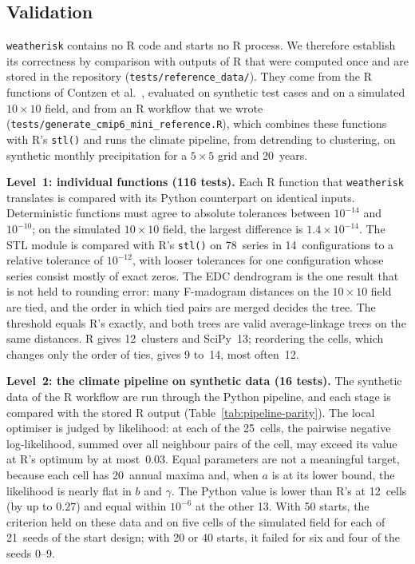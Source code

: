 \documentclass[preprint,12pt,a4paper]{elsarticle}
\begin{document}
\subsection{Validation}
\label{sec:validation}

\texttt{weatherisk} contains no R code and starts no R process. We
therefore establish its correctness by comparison with outputs of R
that were computed once and are stored in the repository
(\texttt{tests/reference\_data/}). They come from the R functions of
Contzen et al.~\cite{contzen2025}, evaluated on synthetic test cases
and on a simulated $10{\times}10$ field, and from an R workflow that
we wrote (\texttt{tests/generate\_cmip6\_mini\_reference.R}), which
combines these functions with R's \texttt{stl()} and runs the
climate pipeline, from detrending to clustering, on synthetic monthly
precipitation for a $5{\times}5$ grid and 20~years.

\textbf{Level~1: individual functions (116 tests).}
Each R function that \texttt{weatherisk} translates is compared with
its Python counterpart on identical inputs. Deterministic functions
must agree to absolute tolerances between $10^{-14}$ and $10^{-10}$;
on the simulated $10{\times}10$ field, the largest difference is
$1.4\times10^{-14}$. The STL module is compared with R's
\texttt{stl()} on 78~series in 14~configurations to a relative
tolerance of $10^{-12}$, with looser tolerances for one configuration
whose series consist mostly of exact zeros. The EDC dendrogram is the one result that is not
held to rounding error: many F-madogram distances on the
$10{\times}10$ field are tied, and the order in which tied pairs
are merged decides the tree. The threshold equals R's exactly, and
both trees are valid average-linkage trees on the same distances.
R gives 12~clusters and SciPy~13; reordering the cells, which
changes only the order of ties, gives 9 to~14, most often~12.

\textbf{Level~2: the climate pipeline on synthetic data (16 tests).}
The synthetic data of the R workflow are run through the Python
pipeline, and each stage is compared with the stored R output
(Table~\ref{tab:pipeline-parity}). The local optimiser is judged by
likelihood: at each of the 25~cells, the pairwise negative
log-likelihood, summed over all neighbour pairs of the cell, may
exceed its value at R's optimum by at most~0.03. Equal parameters
are not a meaningful target, because each cell has 20~annual maxima
and, when $a$ is at its lower bound, the likelihood is nearly flat
in $b$ and $\gamma$. The Python value is lower than R's at 12~cells
(by up to $0.27$) and equal within $10^{-6}$ at the other 13. With
50 starts, the criterion held on these data and on five cells of the
simulated field for each of 21~seeds of the start design; with 20 or
40 starts, it failed for six and four of the seeds 0--9.
\end{document}
